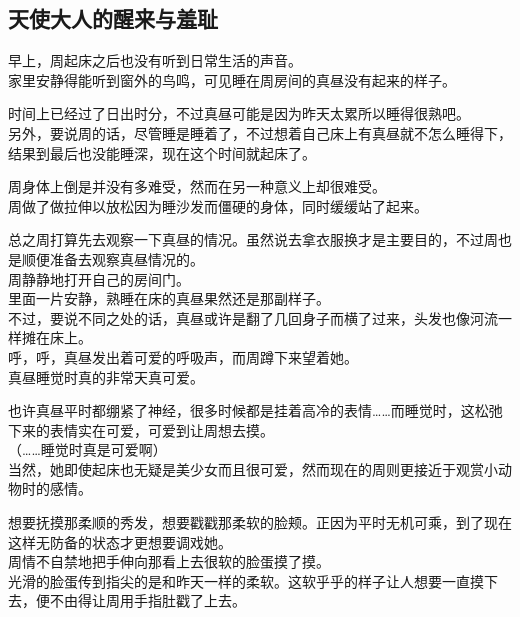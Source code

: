 \subsection{天使大人的醒来与羞耻}

早上，周起床之后也没有听到日常生活的声音。\\

家里安静得能听到窗外的鸟鸣，可见睡在周房间的真昼没有起来的样子。

时间上已经过了日出时分，不过真昼可能是因为昨天太累所以睡得很熟吧。\\

另外，要说周的话，尽管睡是睡着了，不过想着自己床上有真昼就不怎么睡得下，结果到最后也没能睡深，现在这个时间就起床了。

周身体上倒是并没有多难受，然而在另一种意义上却很难受。\\

周做了做拉伸以放松因为睡沙发而僵硬的身体，同时缓缓站了起来。

总之周打算先去观察一下真昼的情况。虽然说去拿衣服换才是主要目的，不过周也是顺便准备去观察真昼情况的。\\

周静静地打开自己的房间门。\\

里面一片安静，熟睡在床的真昼果然还是那副样子。\\

不过，要说不同之处的话，真昼或许是翻了几回身子而横了过来，头发也像河流一样摊在床上。\\

呼，呼，真昼发出着可爱的呼吸声，而周蹲下来望着她。\\

真昼睡觉时真的非常天真可爱。

也许真昼平时都绷紧了神经，很多时候都是挂着高冷的表情……而睡觉时，这松弛下来的表情实在可爱，可爱到让周想去摸。\\

（……睡觉时真是可爱啊）\\

当然，她即使起床也无疑是美少女而且很可爱，然而现在的周则更接近于观赏小动物时的感情。

想要抚摸那柔顺的秀发，想要戳戳那柔软的脸颊。正因为平时无机可乘，到了现在这样无防备的状态才更想要调戏她。\\

周情不自禁地把手伸向那看上去很软的脸蛋摸了摸。\\

光滑的脸蛋传到指尖的是和昨天一样的柔软。这软乎乎的样子让人想要一直摸下去，便不由得让周用手指肚戳了上去。\\

